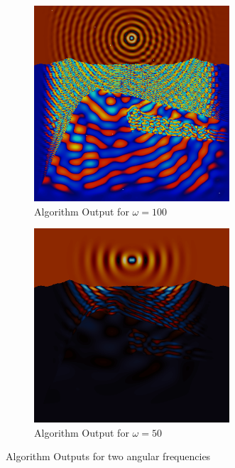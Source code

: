 \begin{figure}[ht]
	\centering
	\begin{subfigure}{0.5\textwidth}
		\centering
		\includegraphics[width=0.8\textwidth]{Images/Automated.png}
		\caption{Algorithm Output for $\omega=100$}
		\label{fig:Automation-small-omega}
	\end{subfigure}%
	\begin{subfigure}{0.5\textwidth}
		\centering
		\includegraphics[width=0.8\textwidth]{Images/Automated-Fail.png}
		\caption{Algorithm Output for $\omega=50$}
		\label{fig:Automation-large-omega}
	\end{subfigure}
	\caption{Algorithm Outputs for two angular frequencies}
	\label{fig:Automation-Success-Failure}
\end{figure}


